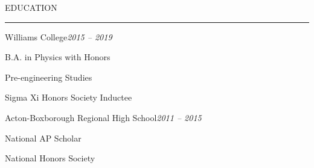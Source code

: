 \documentclass{resume} %
\renewenvironment{rSection}[1]{
	\sectionskip
	\textcolor{RoyalPurple}{\MakeUppercase{#1}}
	\sectionlineskip
	\hrule
	\begin{list}{}{
			\setlength{\leftmargin}{1.5em}
		}
		\item[]
	}{
	\end{list}
}
\begin{document}
\begin{rSection}{Education}
%		
\vspace{-.4em}
		\begin{rSubsection}{Williams College}{\em 2015 -- 2019}{}{}
			\vspace{-.4em}
			\item[] B.A. in Physics with Honors
			\item[] Pre-engineering Studies
			\item[] Sigma Xi Honors Society Inductee
		\end{rSubsection}

		\begin{rSubsection}{Acton-Boxborough Regional High School}{\em 2011 -- 2015}{}{}
			\vspace{-.4em}
			\item[] National AP Scholar
			\item[] National Honors Society
		\end{rSubsection}

\vspace{-1.2em}
	\end{rSection}
	\newcommand{\CC}{C\nolinebreak\hspace{-.05em}\raisebox{.4ex}{\tiny\bf +}\nolinebreak\hspace{-.10em}\raisebox{.4ex}{\tiny\bf +}}
	\def\CC{{C\nolinebreak[4]\hspace{-.05em}\raisebox{.4ex}{\tiny\bf ++}}}
\end{document}
